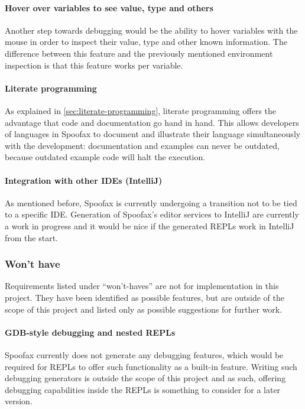 \paragraph{Hover over variables to see value, type and others} Another step
towards debugging would be the ability to hover variables with the mouse in
order to inspect their value, type and other known information. The difference
between this feature and the previously mentioned environment inspection is that
this feature works per variable.

\paragraph{Literate programming} As explained in
\cref{sec:literate-programming}, literate programming offers the advantage that
code and documentation go hand in hand. This allows developers of languages in
Spoofax to document and illustrate their language simultaneously with the
development: documentation and examples can never be outdated, because outdated
example code will halt the execution.

\paragraph{Integration with other IDEs (IntelliJ)} As mentioned before, Spoofax
is currently undergoing a transition not to be tied to a specific IDE.
Generation of Spoofax's editor services to IntelliJ are currently a work in
progress and it would be nice if the generated REPLs work in IntelliJ from the
start.

\subsubsection{Won't have}

Requirements listed under ``won't-haves'' are not for implementation in this
project. They have been identified as possible features, but are outside of the
scope of this project and listed only as possible suggestions for further work.

\paragraph{GDB-style debugging and nested REPLs} Spoofax currently does not
generate any debugging features, which would be required for REPLs to offer such
functionality as a built-in feature. Writing such debugging generators is
outside the scope of this project and as such, offering debugging capabilities
inside the REPLs is something to consider for a later version.

